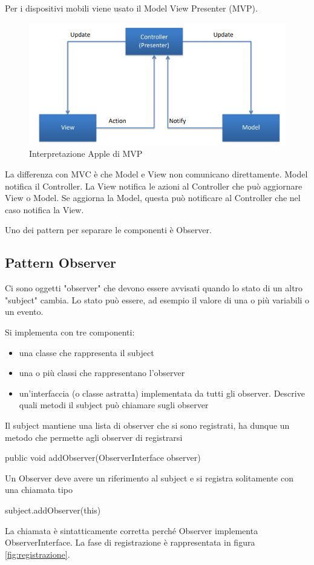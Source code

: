 Per i dispositivi mobili viene usato il Model View Presenter (MVP).
\newpage
\begin{figure}[!ht]
    \centering
    \includegraphics[width=.7\textwidth]{images/Mobile computing/6. Progettazione/MVP.PNG}
    \caption{Interpretazione Apple di MVP}
    \label{fig:MVP}
\end{figure}
La differenza con MVC è che Model e View non comunicano direttamente. Model notifica il Controller. La View notifica le azioni al Controller che può aggiornare View o Model. Se aggiorna la Model, questa può notificare al Controller che nel caso notifica la View. 

Uno dei pattern per separare le componenti è Observer. 

\subsection{Pattern Observer}
Ci sono oggetti "observer" che devono essere avvisati quando lo stato di un altro "subject" cambia. 
Lo stato può essere, ad esempio il valore di una o più variabili o un evento. 

Si implementa con tre componenti: 
\begin{itemize}
    \item una classe che rappresenta il subject
    \item una o più classi che rappresentano l'observer
    \item un'interfaccia (o classe astratta) implementata da tutti gli observer. Descrive quali metodi il subject può chiamare sugli observer
\end{itemize}

Il subject mantiene una lista di observer che si sono registrati, ha dunque un metodo che permette agli observer di registrarsi
\begin{Java}
    public void addObserver(ObserverInterface observer)
\end{Java}
Un Observer deve avere un riferimento al subject e si registra solitamente con una chiamata tipo 
\begin{Java}
    subject.addObserver(this)
\end{Java}
La chiamata è sintatticamente corretta perché Observer implementa 
ObserverInterface.
La fase di registrazione è rappresentata in figura \ref{fig:registrazione}.

